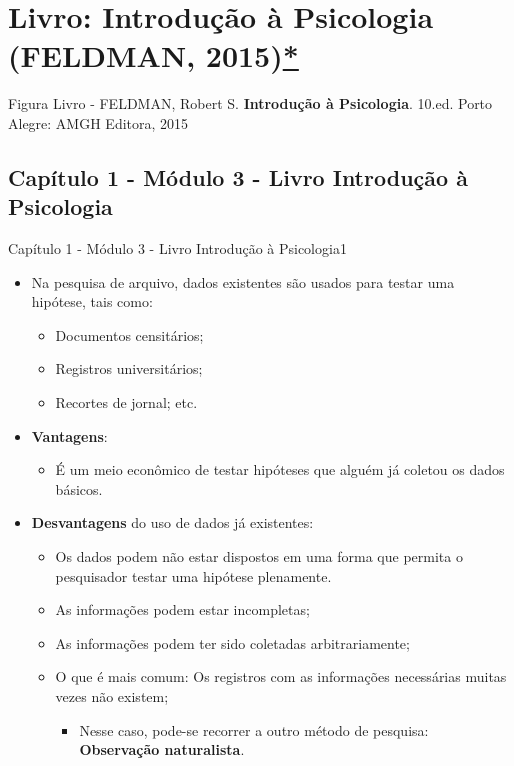 \documentclass[
]{book}
\providecommand{\tightlist}{%
  \setlength{\itemsep}{0pt}\setlength{\parskip}{0pt}}
\begin{document}
\hypertarget{livro-introduuxe7uxe3o-uxe0-psicologia-feldman-2015}{%
\section{\texorpdfstring{Livro: \textbf{Introdução à Psicologia} (FELDMAN, 2015)\protect\hyperlink{feldman}{*}}{Livro: Introdução à Psicologia (FELDMAN, 2015)*}}\label{livro-introduuxe7uxe3o-uxe0-psicologia-feldman-2015}}

Figura Livro - FELDMAN, Robert S. \textbf{Introdução à Psicologia}. 10.ed. Porto Alegre: AMGH Editora, 2015

\hypertarget{capuxedtulo-1---muxf3dulo-3---livro-introduuxe7uxe3o-uxe0-psicologia}{%
\subsection{Capítulo 1 - Módulo 3 - Livro Introdução à Psicologia}\label{capuxedtulo-1---muxf3dulo-3---livro-introduuxe7uxe3o-uxe0-psicologia}}

Capítulo 1 - Módulo 3 - Livro Introdução à Psicologia1

\begin{itemize}
\tightlist
\item
  Na pesquisa de arquivo, dados existentes são usados para testar uma hipótese, tais como:

  \begin{itemize}
  \tightlist
  \item
    Documentos censitários;
  \item
    Registros universitários;
  \item
    Recortes de jornal; etc.
  \end{itemize}
\item
  \textbf{Vantagens}:

  \begin{itemize}
  \tightlist
  \item
    É um meio econômico de testar hipóteses que alguém já coletou os dados básicos.
  \end{itemize}
\item
  \textbf{Desvantagens} do uso de dados já existentes:

  \begin{itemize}
  \tightlist
  \item
    Os dados podem não estar dispostos em uma forma que permita o pesquisador testar uma hipótese plenamente.
  \item
    As informações podem estar incompletas;
  \item
    As informações podem ter sido coletadas arbitrariamente;
  \item
    O que é mais comum: Os registros com as informações necessárias muitas vezes não existem;

    \begin{itemize}
    \tightlist
    \item
      Nesse caso, pode-se recorrer a outro método de pesquisa: \textbf{Observação naturalista}.
    \end{itemize}
  \end{itemize}
\end{itemize}
\end{document}
